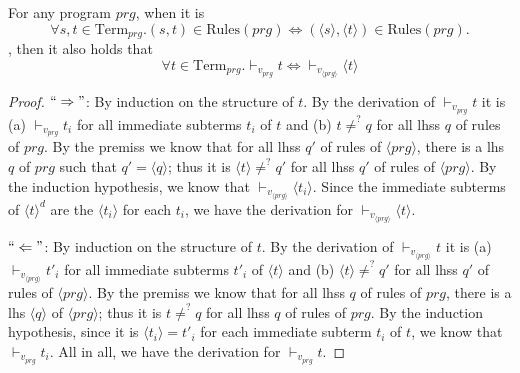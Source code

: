 \begin{lemma}
For any program $prg$, when it is
\[
\forall s,t \in \textrm{Term}_{prg}. (s, t) \in \textrm{Rules}(prg) \iff (\langle s \rangle, \langle t \rangle) \in \textrm{Rules}(prg).
\]
, then it also holds that
\label{lem:ivj}
\[
\forall t \in \textrm{Term}_{prg}. \vdash_{v_{prg}} t \iff \vdash_{v_{\langle prg \rangle}} \langle t \rangle
\]
\begin{proof}
$``\Rightarrow"$: By induction on the structure of $t$. By the derivation of $\vdash_{v_{prg}} t$ it is (a) $\vdash_{v_{prg}} t_i$ for all immediate subterms $t_i$ of $t$ and (b) $t \neq^? q$ for all lhss $q$ of rules of $prg$. By the premiss we know that for all lhss $q'$ of rules of $\langle prg \rangle$, there is a lhs $q$ of $prg$ such that $q' = \langle q \rangle$; thus it is $\langle t \rangle \neq^? q'$ for all lhss $q'$ of rules of $\langle prg \rangle$. By the induction hypothesis, we know that $\vdash_{v_{\langle prg \rangle}} \langle t_i \rangle$. Since the immediate subterms of $\langle t \rangle^d$ are the $\langle t_i \rangle$ for each $t_i$, we have the derivation for $\vdash_{v_{\langle prg \rangle}} \langle t \rangle$.

$``\Leftarrow"$: By induction on the structure of $t$. By the derivation of $\vdash_{v_{\langle prg \rangle}} t$ it is (a) $\vdash_{v_{\langle prg \rangle}} t'_i$ for all immediate subterms $t'_i$ of $\langle t \rangle$ and (b) $\langle t \rangle \neq^? q'$ for all lhss $q'$ of rules of $\langle prg \rangle$. By the premiss we know that for all lhss $q$ of rules of $prg$, there is a lhs $\langle q \rangle$ of $\langle prg \rangle$; thus it is $t \neq^? q$ for all lhss $q$ of rules of $prg$. By the induction hypothesis, since it is $\langle t_i \rangle = t'_i$ for each immediate subterm $t_i$ of $t$, we know that $\vdash_{v_{prg}} t_i$. All in all, we have the derivation for $\vdash_{v_{prg}} t$.
\end{proof}
\end{lemma}

